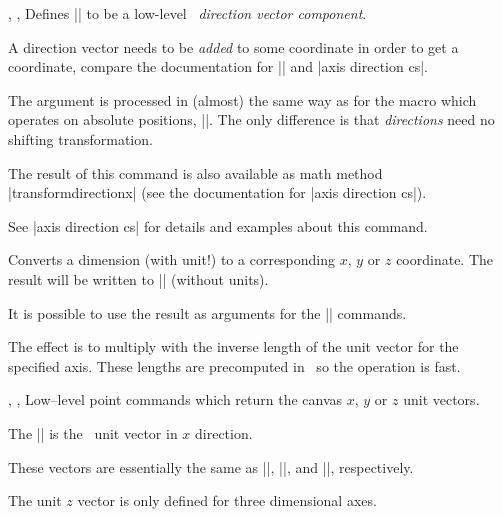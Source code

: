 \begin{commandlist}{%
	\pgfplotstransformdirectionx{},%
	\pgfplotstransformdirectiony{},%
	\pgfplotstransformdirectiony{}}
	Defines |\pgfmathresult| to be a low-level \PGF\ \emph{direction vector component}.

	A direction vector needs to be \emph{added} to some coordinate in order to get a coordinate, compare the documentation for |\pgfplotspointaxisdirectionxy| and |axis direction cs|.

	The argument  is processed in (almost) the same way as for the macro which operates on absolute positions, |\pgfplotstransformcoordinatex|. The only difference is that \emph{directions} need no shifting transformation. 

	The result of this command is also available as math method |transformdirectionx| (see the documentation for |axis direction cs|).

	See |axis direction cs| for details and examples about this command.
\end{commandlist}

\begin{command}{\pgfplotsconvertunittocoordinate{}}
	Converts a dimension (with unit!) to a corresponding $x$, $y$ or $z$ coordinate. The result will be written to |\pgfmathresult| (without units).

	It is possible to use the result as arguments for the |\pgfpointxyz| commands.

	The effect is to multiply  with the inverse length of the unit vector for the specified axis. These lengths are precomputed in \PGFPlots\ so the operation is fast.
\begin{codeexample}
\end{codeexample}
\end{command}


\begin{commandlist}{%
	\pgfplotspointunitx,%
	\pgfplotspointunity,%
	\pgfplotspointunitz}%
	Low--level point commands which return the canvas $x$, $y$ or $z$ unit vectors.

	The |\pgfplotspointunitx| is the \pgfname\ unit vector in $x$ direction.

	These vectors are essentially the same as ||, ||, and ||, respectively.

	The unit $z$ vector is only defined for three dimensional axes.
\end{commandlist}

